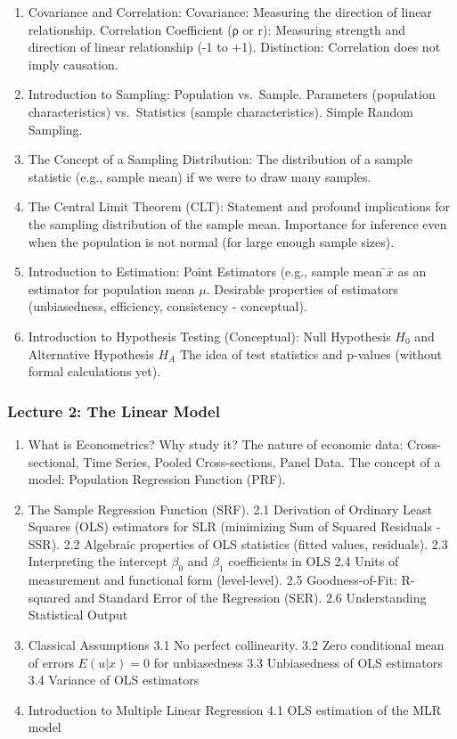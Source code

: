 \documentclass[
]{article}
\begin{document}
\begin{enumerate}
\def\labelenumi{\arabic{enumi}.}
\setcounter{enumi}{6}
\item
  Covariance and Correlation: Covariance: Measuring the direction of
  linear relationship. Correlation Coefficient (ρ or r): Measuring
  strength and direction of linear relationship (-1 to +1). Distinction:
  Correlation does not imply causation.
\item
  Introduction to Sampling: Population vs.~Sample. Parameters
  (population characteristics) vs.~Statistics (sample characteristics).
  Simple Random Sampling.
\item
  The Concept of a Sampling Distribution: The distribution of a sample
  statistic (e.g., sample mean) if we were to draw many samples.
\item
  The Central Limit Theorem (CLT): Statement and profound implications
  for the sampling distribution of the sample mean. Importance for
  inference even when the population is not normal (for large enough
  sample sizes).
\item
  Introduction to Estimation: Point Estimators (e.g., sample mean
  ̄\(\bar{x}\) as an estimator for population mean \(\mu\). Desirable
  properties of estimators (unbiasedness, efficiency, consistency -
  conceptual).
\item
  Introduction to Hypothesis Testing (Conceptual): Null Hypothesis
  \(H_0\) and Alternative Hypothesis \(H_A\) The idea of test statistics
  and p-values (without formal calculations yet).
\end{enumerate}

\subsubsection{Lecture 2: The Linear
Model}\label{lecture-2-the-linear-model}

\begin{enumerate}
\def\labelenumi{\arabic{enumi}.}
\item
  What is Econometrics? Why study it? The nature of economic data:
  Cross-sectional, Time Series, Pooled Cross-sections, Panel Data. The
  concept of a model: Population Regression Function (PRF).
\item
  The Sample Regression Function (SRF). 2.1 Derivation of Ordinary Least
  Squares (OLS) estimators for SLR (minimizing Sum of Squared Residuals
  - SSR). 2.2 Algebraic properties of OLS statistics (fitted values,
  residuals). 2.3 Interpreting the intercept \(\beta_0\) and \(\beta_1\)
  coefficients in OLS 2.4 Units of measurement and functional form
  (level-level). 2.5 Goodness-of-Fit: R-squared and Standard Error of
  the Regression (SER). 2.6 Understanding Statistical Output
\item
  Classical Assumptions 3.1 No perfect collinearity. 3.2 Zero
  conditional mean of errors \(E(u|x) = 0\) for unbiasedness 3.3
  Unbiasedness of OLS estimators 3.4 Variance of OLS estimators
\item
  Introduction to Multiple Linear Regression 4.1 OLS estimation of the
  MLR model
\end{enumerate}
\end{document}
